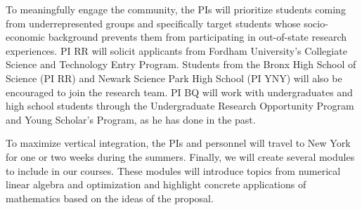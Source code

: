 To meaningfully engage the community,
the PIs will prioritize students coming
from underrepresented groups and
specifically target students whose socio-economic
background prevents them from participating in out-of-state research
experiences.  PI RR will solicit applicants from Fordham University's
Collegiate Science and Technology Entry Program.
Students from the Bronx High School of Science (PI
RR) and Newark Science Park High School (PI YNY) will also be encouraged to
join the research team. PI BQ will work with undergraduates and high
school students through the Undergraduate Research Opportunity Program
and Young Scholar's Program, as he has done in the past.

To maximize vertical integration, the PIs and personnel
will travel to New York for one or two weeks during the summers.
Finally, we will create several modules to include in our courses. These
modules will introduce topics from numerical linear algebra and
optimization and highlight concrete applications of mathematics
based on the ideas of the proposal.



